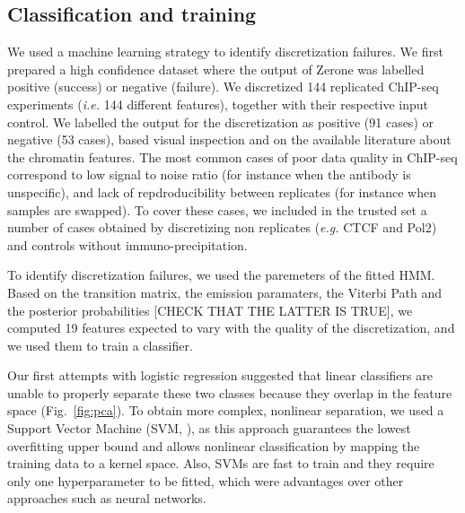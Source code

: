 \documentclass{bioinfo}
\begin{document}
\begin{methods}
\subsection{Classification and training}\label{sub:training}
We used a machine learning strategy to identify discretization
failures. We first prepared a high confidence dataset where the
output of Zerone was labelled positive (success) or negative (failure).
We discretized 144 replicated ChIP-seq experiments (\textit{i.e.}
144 different features), together with their respective input control.
We labelled the output for the discretization as positive (91 cases)
or negative (53 cases), based visual inspection and on the available
literature about the chromatin features. The most common cases of
poor data quality in ChIP-seq correspond to low signal to noise ratio
(for instance when the antibody is unspecific), and lack of
repdroducibility between replicates (for instance when samples are
swapped). To cover these cases, we included in the trusted set
a number of cases obtained by discretizing non replicates
(\textit{e.g.} CTCF and Pol2) and controls without
immuno-precipitation.

To identify discretization failures, we used the paremeters of the
fitted HMM.  Based on the transition matrix, the emission paramaters,
the Viterbi Path and the posterior probabilities [CHECK THAT THE LATTER
IS TRUE], we computed 19 features expected to vary with the quality
of the discretization, and we used them to train a classifier.

Our first attempts with logistic regression suggested that linear
classifiers are unable to properly separate these two classes because
they overlap in the feature space (Fig.~\ref{fig:pca}). To obtain more
complex, nonlinear separation, we used a Support Vector Machine
(SVM, \cite{Chang2011,e1071}), as this approach guarantees the lowest
overfitting upper bound and allows nonlinear classification by mapping
the training data to a kernel space. Also, SVMs are fast to train and
they require only one hyperparameter to be fitted, which were
advantages over other approaches such as neural networks.


\end{methods}
\end{document}
